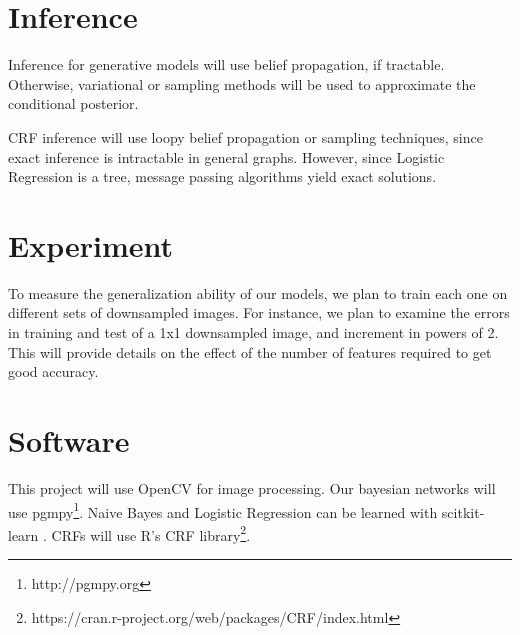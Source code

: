 \documentclass{article}
\begin{document}
\section{Inference}
Inference for generative models will use belief propagation, if tractable.
Otherwise, variational or sampling methods \cite{NUTS} will be
used to approximate the conditional posterior.

CRF inference will use loopy belief propagation or sampling techniques,
since exact inference is intractable in general graphs.
However, since Logistic Regression is a tree, message passing algorithms
yield exact solutions.

\section{Experiment}
To measure the generalization ability of our models, we plan to train each one
on different sets of downsampled images. For instance, we plan to examine the
errors in training and test of a 1x1 downsampled image, and increment in powers
of 2. This will provide details on the effect of the number of features required
to get good accuracy.

\section{Software}
\label{software}
This project will use OpenCV \cite{opencv} for image processing.
Our bayesian networks will use pgmpy\footnote{http://pgmpy.org}.
Naive Bayes and Logistic Regression can be learned with scitkit-learn \cite{scikit-learn}.
CRFs will use R's CRF library\footnote{https://cran.r-project.org/web/packages/CRF/index.html}.






\end{document}
